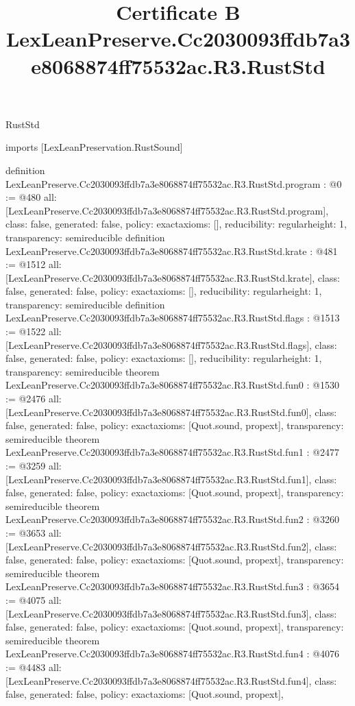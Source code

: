 \begin{lexlean}{RustStd}
\title{Certificate B LexLeanPreserve.Cc2030093ffdb7a3e8068874ff75532ac.R3.RustStd}
\begin{coremodule}
imports [LexLeanPreservation.RustSound]

definition LexLeanPreserve.Cc2030093ffdb7a3e8068874ff75532ac.R3.RustStd.program : @0 := @480 {
  all: [LexLeanPreserve.Cc2030093ffdb7a3e8068874ff75532ac.R3.RustStd.program],
  class: false,
  generated: false,
  policy: exact{axioms: []},
  reducibility: regular{height: 1},
  transparency: semireducible
}
definition LexLeanPreserve.Cc2030093ffdb7a3e8068874ff75532ac.R3.RustStd.krate : @481 := @1512 {
  all: [LexLeanPreserve.Cc2030093ffdb7a3e8068874ff75532ac.R3.RustStd.krate],
  class: false,
  generated: false,
  policy: exact{axioms: []},
  reducibility: regular{height: 1},
  transparency: semireducible
}
definition LexLeanPreserve.Cc2030093ffdb7a3e8068874ff75532ac.R3.RustStd.flags : @1513 := @1522 {
  all: [LexLeanPreserve.Cc2030093ffdb7a3e8068874ff75532ac.R3.RustStd.flags],
  class: false,
  generated: false,
  policy: exact{axioms: []},
  reducibility: regular{height: 1},
  transparency: semireducible
}
theorem LexLeanPreserve.Cc2030093ffdb7a3e8068874ff75532ac.R3.RustStd.fun0 : @1530 := @2476 {
  all: [LexLeanPreserve.Cc2030093ffdb7a3e8068874ff75532ac.R3.RustStd.fun0],
  class: false,
  generated: false,
  policy: exact{axioms: [Quot.sound, propext]},
  transparency: semireducible
}
theorem LexLeanPreserve.Cc2030093ffdb7a3e8068874ff75532ac.R3.RustStd.fun1 : @2477 := @3259 {
  all: [LexLeanPreserve.Cc2030093ffdb7a3e8068874ff75532ac.R3.RustStd.fun1],
  class: false,
  generated: false,
  policy: exact{axioms: [Quot.sound, propext]},
  transparency: semireducible
}
theorem LexLeanPreserve.Cc2030093ffdb7a3e8068874ff75532ac.R3.RustStd.fun2 : @3260 := @3653 {
  all: [LexLeanPreserve.Cc2030093ffdb7a3e8068874ff75532ac.R3.RustStd.fun2],
  class: false,
  generated: false,
  policy: exact{axioms: [Quot.sound, propext]},
  transparency: semireducible
}
theorem LexLeanPreserve.Cc2030093ffdb7a3e8068874ff75532ac.R3.RustStd.fun3 : @3654 := @4075 {
  all: [LexLeanPreserve.Cc2030093ffdb7a3e8068874ff75532ac.R3.RustStd.fun3],
  class: false,
  generated: false,
  policy: exact{axioms: [Quot.sound, propext]},
  transparency: semireducible
}
theorem LexLeanPreserve.Cc2030093ffdb7a3e8068874ff75532ac.R3.RustStd.fun4 : @4076 := @4483 {
  all: [LexLeanPreserve.Cc2030093ffdb7a3e8068874ff75532ac.R3.RustStd.fun4],
  class: false,
  generated: false,
  policy: exact{axioms: [Quot.sound, propext]},
}
\end{coremodule}
\end{lexlean}
